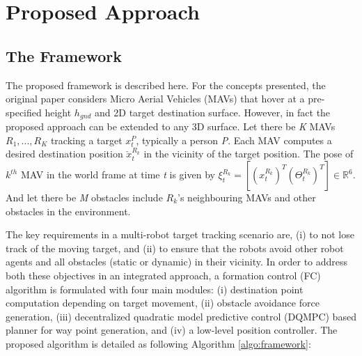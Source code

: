 \documentclass[12pt]{article}
\begin{document}
\begin{comment}
\section{Related Work}
In general, motion planner with obstacle avoidance for multi-agents can be classified into, (i) reactive and, (ii) optimization based approaches. Most reactive approaches are based on velocity obstacle (VO), whereas, optimization based approaches avoid obstacles by embedding collision constraints (like VO) within cost function or as hard constraints in optimization. Recently a mixed integer quadratic program (MIQP) based on centralized non-linear model predictive control (NMPC) \cite{fukushima2013model} has been proposed, where a variant of the branch and bound algorithm is used to realize feedback linearization. However this approach suffers with agent scale-up, since increase in binary variables of MIQP results in exponential complexity. 
\end{comment}

\section{Proposed Approach}
\subsection{The Framework}
\label{sec:framework}
The proposed framework is described here. For the concepts presented, the original paper considers Micro Aerial Vehicles (MAVs) that hover at a pre-specified height $h_{gnd}$ and 2D target destination surface. However, in fact the proposed approach can be extended to any 3D surface. Let there be \emph{K} MAVs $R_{1},...,R_{K}$ tracking a target $x_{t}^{P}$, typically a person \emph{P}. Each MAV computes a desired destination position $\check{x}_{t}^{R_{k}}$ in the vicinity of the target position. The pose of $k^{th}$ MAV in the world frame at time \emph{t} is given by $\xi_{t}^{R_{k}} = [(x_{t}^{R_{k}})^{T} (\Theta_{t}^{R_{k}})^{T}] \in \mathbb{R}^{6}$. And let there be \emph{M} obstacles include $R_{k}$'s neighbouring MAVs and other obstacles in the environment.

The key requirements in a multi-robot target tracking scenario are, (i) to not lose track of the moving target, and (ii) to ensure that the robots avoid other robot agents and all obstacles (static or dynamic) in their vicinity. In order to address both these objectives in an integrated approach, a formation control (FC) algorithm is formulated with four main modules: (i) destination point computation depending on target movement, (ii) obstacle avoidance force generation, (iii) decentralized quadratic model predictive control (DQMPC) based planner for way point generation, and (iv) a low-level position controller. The proposed algorithm is detailed as following Algorithm \ref{algo:framework}:
\end{document}
